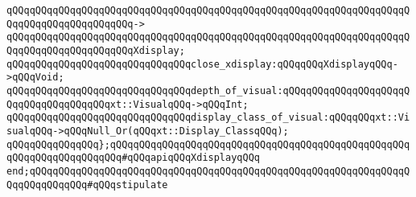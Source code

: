 \verb|qQQqqQQqqQQqqQQqqQQqqQQqqQQqqQQqqQQqqQQqqQQqqQQqqQQqqQQqqQQqqQQqqQQqqQQqqQQqqQQqqQQqqQQqqQQq->|\newline
\verb|qQQqqQQqqQQqqQQqqQQqqQQqqQQqqQQqqQQqqQQqqQQqqQQqqQQqqQQqqQQqqQQqqQQqqQQqqQQqqQQqqQQqqQQqqQQqXdisplay;|\newline
\newline
\verb|qQQqqQQqqQQqqQQqqQQqqQQqqQQqqQQqclose_xdisplay:qQQqqQQqXdisplayqQQq->qQQqVoid;|\newline
\newline
\verb|qQQqqQQqqQQqqQQqqQQqqQQqqQQqqQQqdepth_of_visual:qQQqqQQqqQQqqQQqqQQqqQQqqQQqqQQqqQQqqQQqxt::VisualqQQq->qQQqInt;|\newline
\verb|qQQqqQQqqQQqqQQqqQQqqQQqqQQqqQQqdisplay_class_of_visual:qQQqqQQqxt::VisualqQQq->qQQqNull_Or(qQQqxt::Display_ClassqQQq);|\newline
\newline
\verb|qQQqqQQqqQQqqQQq};qQQqqQQqqQQqqQQqqQQqqQQqqQQqqQQqqQQqqQQqqQQqqQQqqQQqqQQqqQQqqQQqqQQqqQQq#qQQqapiqQQqXdisplayqQQq|\newline
\newline
\verb|end;qQQqqQQqqQQqqQQqqQQqqQQqqQQqqQQqqQQqqQQqqQQqqQQqqQQqqQQqqQQqqQQqqQQqqQQqqQQqqQQq#qQQqstipulate|\newline
\newline

